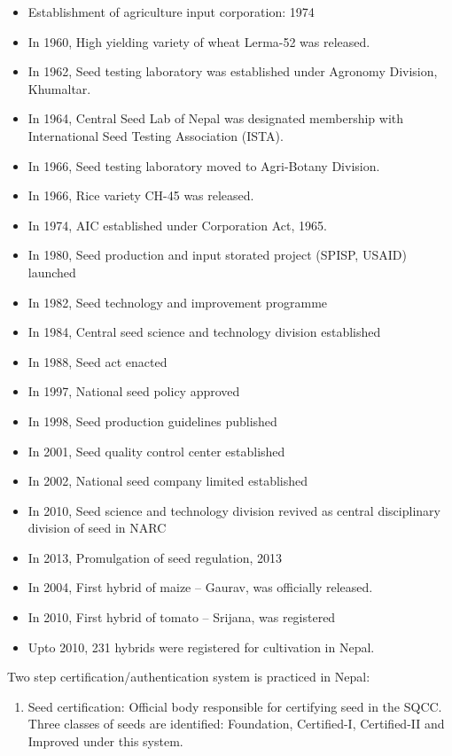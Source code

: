 \documentclass[
  openany]{book}
\providecommand{\tightlist}{%
  \setlength{\itemsep}{0pt}\setlength{\parskip}{0pt}}
\begin{document}
\begin{itemize}
\tightlist
\item
  Establishment of agriculture input corporation: 1974
\item
  In 1960, High yielding variety of wheat Lerma-52 was released.
\item
  In 1962, Seed testing laboratory was established under Agronomy Division, Khumaltar.
\item
  In 1964, Central Seed Lab of Nepal was designated membership with International Seed Testing Association (ISTA).
\item
  In 1966, Seed testing laboratory moved to Agri-Botany Division.
\item
  In 1966, Rice variety CH-45 was released.
\item
  In 1974, AIC established under Corporation Act, 1965.
\item
  In 1980, Seed production and input storated project (SPISP, USAID) launched
\item
  In 1982, Seed technology and improvement programme
\item
  In 1984, Central seed science and technology division established
\item
  In 1988, Seed act enacted
\item
  In 1997, National seed policy approved
\item
  In 1998, Seed production guidelines published
\item
  In 2001, Seed quality control center established
\item
  In 2002, National seed company limited established
\item
  In 2010, Seed science and technology division revived as central disciplinary division of seed in NARC
\item
  In 2013, Promulgation of seed regulation, 2013
\item
  In 2004, First hybrid of maize -- Gaurav, was officially released.
\item
  In 2010, First hybrid of tomato -- Srijana, was registered
\item
  Upto 2010, 231 hybrids were registered for cultivation in Nepal.
\end{itemize}

Two step certification/authentication system is practiced in Nepal:

\begin{enumerate}
\def\labelenumi{\arabic{enumi}.}
\tightlist
\item
  Seed certification: Official body responsible for certifying seed in the SQCC. Three classes of seeds are identified: Foundation, Certified-I, Certified-II and Improved under this system.
\end{enumerate}
\end{document}
